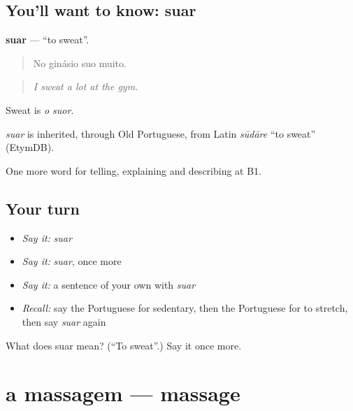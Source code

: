 \subsection*{You'll want to know: suar}
\textbf{suar} — \textquotedblleft{}to sweat\textquotedblright{}.

\begin{quote}
No ginásio suo muito.
\end{quote}

\begin{quote}
\emph{I sweat a lot at the gym.}
\end{quote}

Sweat is \emph{o suor}.

\begin{cousinweb}
\emph{suar} is inherited, through Old Portuguese, from Latin \emph{sūdāre} \textquotedblleft{}to sweat\textquotedblright{} (EtymDB).
\end{cousinweb}

\begin{grammarlens}[title={What you've built}]
One more word for telling, explaining and describing at B1.
\end{grammarlens}

\subsection*{Your turn}
\begin{itemize}
\raggedright
  \item \emph{Say it:} \emph{suar}
  \item \emph{Say it:} \emph{suar}, once more
  \item \emph{Say it:} a sentence of your own with \emph{suar}
  \item \emph{Recall:} say the Portuguese for sedentary, then the Portuguese for to stretch, then say \emph{suar} again
\end{itemize}

\begin{tcolorbox}[breakable,colback=teal!4,colframe=teal!35!black,title={Before you move on}]
What does suar mean? (\textquotedblleft{}To sweat\textquotedblright{}.) Say it once more.
\end{tcolorbox}
\section[a massagem]{a massagem — massage}

\label{lesson:PT-C490-massagem}



